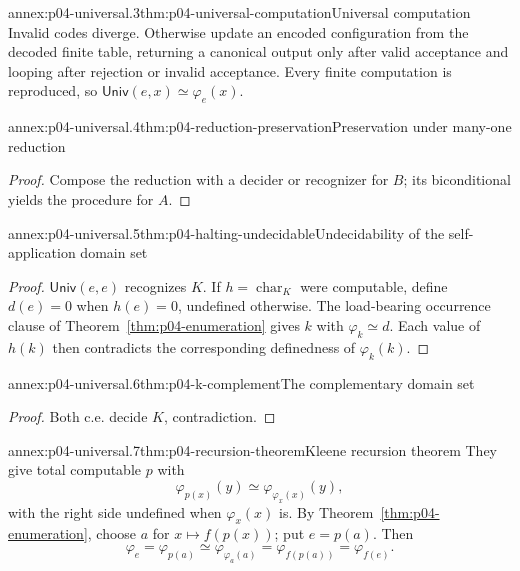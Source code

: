 \begin{annexitem}{annex:p04-universal.3}{thm:p04-universal-computation}{Universal computation}
Invalid codes diverge.  Otherwise update an encoded configuration from the
decoded finite table, returning a canonical output only after valid acceptance
and looping after rejection or invalid acceptance.  Every finite computation
is reproduced, so \(\mathsf{Univ}(e,x)\simeq\varphi_e(x)\).
\end{annexitem}

\begin{annexitem}{annex:p04-universal.4}{thm:p04-reduction-preservation}{Preservation under many-one reduction}
\begin{proof}
Compose the reduction with a decider or recognizer for \(B\); its
biconditional yields the procedure for \(A\).
\end{proof}
\end{annexitem}

\begin{annexitem}{annex:p04-universal.5}{thm:p04-halting-undecidable}{Undecidability of the self-application domain set}
\begin{proof}
\(\mathsf{Univ}(e,e)\) recognizes \(K\).  If
\(h=\operatorname{char}_K\) were computable, define
\(d(e)=0\) when \(h(e)=0\), undefined otherwise.  The load-bearing occurrence
clause of Theorem~\ref{thm:p04-enumeration} gives \(k\) with
\(\varphi_k\simeq d\).  Each value of \(h(k)\) then contradicts the
corresponding definedness of \(\varphi_k(k)\).
\end{proof}
\end{annexitem}

\begin{annexitem}{annex:p04-universal.6}{thm:p04-k-complement}{The complementary domain set}
\begin{proof}
Both c.e. decide \(K\), contradiction.
\end{proof}
\end{annexitem}

\begin{annexitem}{annex:p04-universal.7}{thm:p04-recursion-theorem}{Kleene recursion theorem}
They give total computable \(p\) with
\[
  \varphi_{p(x)}(y)\simeq\varphi_{\varphi_x(x)}(y),
\]
with the right side undefined when \(\varphi_x(x)\) is.  By
Theorem~\ref{thm:p04-enumeration}, choose \(a\) for
\(x\mapsto f(p(x))\); put \(e=p(a)\).  Then
\[
  \varphi_e=\varphi_{p(a)}
  \simeq\varphi_{\varphi_a(a)}
  =\varphi_{f(p(a))}=\varphi_{f(e)}.
\]
\end{annexitem}

